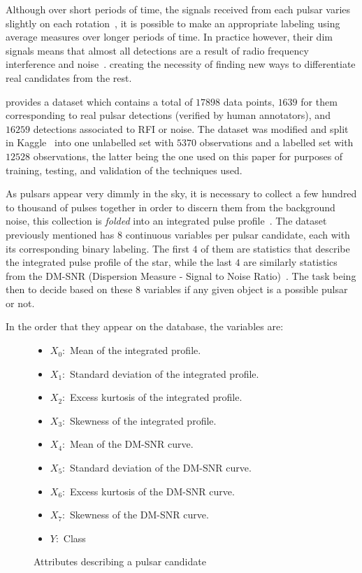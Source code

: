 \documentclass[journal]{IEEEtran}
\begin{document}
Although over short periods of time, the signals received from each pulsar
varies slightly on each rotation~\cite{pulsar:importance:kramer}, it is possible
to make an appropriate labeling using average measures over longer periods of
time. In practice however, their dim signals means that almost all detections
are a result of radio frequency interference and
noise~\cite{pulsar:dataset:explanation:lyon}. creating the necessity of finding
new ways to differentiate real candidates from the rest.

\citet{pulsar:dataset:lyon} provides a dataset which contains a total of $17898$
data points, $1639$ for them corresponding to real pulsar detections (verified
by human annotators), and $16259$ detections associated to RFI or noise. The
dataset was modified and split in Kaggle~\cite{pulsar:dataset:kaggle} into one
unlabelled set with $5370$ observations and a labelled set with $12528$
observations, the latter being the one used on this paper for purposes of
training, testing, and validation of the techniques used.

As pulsars appear very dimmly in the sky, it is necessary to collect a few
hundred to thousand of pulses together in order to discern them from the
background noise, this collection is \textit{folded} into an integrated pulse
profile~\cite{pulsar:importance:kramer}. The dataset previously mentioned has 8
continuous variables per pulsar candidate, each with its corresponding binary
labeling. The first $4$ of them are statistics that describe the integrated
pulse profile of the star, while the last $4$ are similarly statistics from the
DM-SNR (Dispersion Measure - Signal to Noise
Ratio)~\cite{pulsar:dataset:explanation:lyon}. The task being then to decide
based on these 8 variables if any given object is a possible pulsar or not.

In the order that they appear on the database, the variables are:

\begin{figure}[ht]
    \begin{itemize}
        \item $X_0:$ Mean of the integrated profile.
        \item $X_1:$ Standard deviation of the integrated profile.
        \item $X_2:$ Excess kurtosis of the integrated profile.
        \item $X_3:$ Skewness of the integrated profile.
        \item $X_4:$ Mean of the DM-SNR curve.
        \item $X_5:$ Standard deviation of the DM-SNR curve.
        \item $X_6:$ Excess kurtosis of the DM-SNR curve.
        \item $X_7:$ Skewness of the DM-SNR curve.
        \item $Y:$ Class 
    \end{itemize}
    \caption{Attributes describing a pulsar candidate\label{fig:variables}}
\end{figure}
\end{document}
